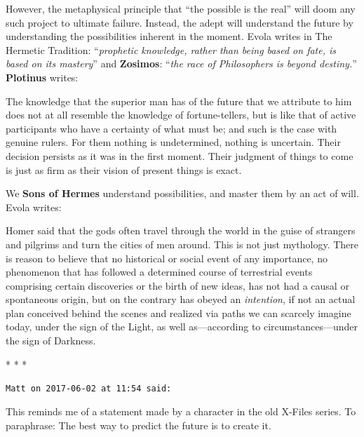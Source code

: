 However, the metaphysical principle that ``the possible is the real'' will doom any such project to ultimate failure. Instead, the adept will understand the future by understanding the possibilities inherent in the moment. Evola writes in The Hermetic Tradition: ``\emph{prophetic knowledge, rather than being based on fate, is based on its mastery}'' and \textbf{Zosimos}: ``\emph{the race of Philosophers is beyond destiny.}'' \textbf{Plotinus} writes:

\begin{quotex}
The knowledge that the superior man has of the future that we attribute to him does not at all resemble the knowledge of fortune-tellers, but is like that of active participants who have a certainty of what must be; and such is the case with genuine rulers. For them nothing is undetermined, nothing is uncertain. Their decision persists as it was in the first moment. Their judgment of things to come is just as firm as their vision of present things is exact.
\end{quotex}


We \textbf{Sons of Hermes} understand possibilities, and master them by an act of will. Evola writes:

\begin{quotex}
Homer said that the gods often travel through the world in the guise of strangers and pilgrims and turn the cities of men around. This is not just mythology. There is reason to believe that no historical or social event of any importance, no phenomenon that has followed a determined course of terrestrial events comprising certain discoveries or the birth of new ideas, has not had a causal or spontaneous origin, but on the contrary has obeyed an \emph{intention}, if not an actual plan conceived behind the scenes and realized via paths we can scarcely imagine today, under the sign of the Light, as well as---according to circumstances---under the sign of Darkness.
\end{quotex}




\begin{center}* * *\end{center}

\begin{footnotesize}
\begin{sffamily}
\texttt{Matt on 2017-06-02 at 11:54 said:}

This reminds me of a statement made by a character in the old X-Files series. To paraphrase: The best way to predict the future is to create it.

\end{sffamily}
\end{footnotesize}

